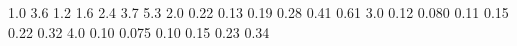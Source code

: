 1.0  3.6  1.2  1.6  2.4  3.7  5.3 
2.0  0.22  0.13  0.19  0.28  0.41  0.61 
3.0  0.12  0.080  0.11  0.15  0.22  0.32 
4.0  0.10  0.075  0.10  0.15  0.23  0.34 
